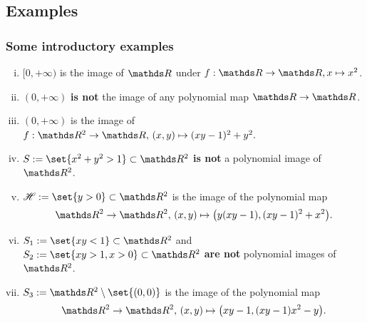 \documentclass{beamer}
\begin{document}
\subsection{Examples}
\begin{frame}
\frametitle{Some introductory examples}
\begin{enumerate}[(i)]
\item $[0,+\infty)$ is the image of $\R$ under $f:\R\to\R, x\mapsto x^2$.  
\vspace{0.3cm}

\item $(0,+\infty)$ \textbf{is not} the image of any polynomial map $\R\to\R$.   
\vspace{0.3cm}

\item $(0,+\infty)$ is the image of $f:\R^2\to\R,\, (x,y)\mapsto (xy-1)^2+y^2.$    
\vspace{0.3cm}

\item $S:=\set{x^2+y^2>1}\subset \R^2$ \textbf{is not} a polynomial image of $\R^2$.
\vspace{0.3cm}

\item $\H:=\set{y>0}\subset\R^2$ is the image of the polynomial map $$\R^2\to\R^2,\, (x,y)\mapsto \big(y(xy-1),(xy-1)^2+x^2\big).$$  
\vspace{-0.4cm}

\item $S_1:=\set{xy<1}\subset \R^2$ and $S_2:=\set{xy>1,x>0}\subset \R^2$ \textbf{are not} polynomial images of $\R^2$.
\vspace{0.3cm}

\item $S_3:=\R^2\setminus\set{(0,0)}$ is the image of the polynomial map $$\R^2\to\R^2,\, (x,y)\mapsto \big(xy-1,(xy-1)x^2-y\big).$$

\end{enumerate}
\end{frame}
\end{document}
